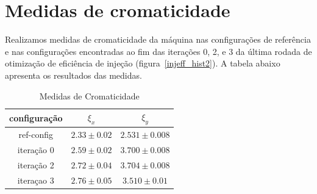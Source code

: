 \documentclass[a4paper,
               keeplastbox,   %
               ]{jacow}
\begin{document}
\section{Medidas de cromaticidade}
Realizamos medidas de cromaticidade da máquina nas configurações de referência e nas configurações encontradas ao fim das iterações 0, 2, e 3 da última rodada de otimização de eficiência de injeção (figura~\ref{injeff_hist2}). A tabela abaixo apresenta os resultados das medidas.
\begin{table}[h]
\centering
\begin{tabular}{@{}ccc@{}}
\toprule
configuração & $\xi_x$       & $\xi_y$         \\ \midrule
ref-config   & $2.33\pm0.02$ & $2.531\pm0.008$ \\
iteração 0   & $2.59\pm0.02$ & $3.700\pm0.008$   \\
iteração 2   & $2.72\pm0.04$ & $3.704\pm0.008$ \\
iteraçao 3   & $2.76\pm0.05$  & $3.510\pm0.01$   \\ \bottomrule
\end{tabular}
\caption{Medidas de Cromaticidade}
\end{table}





\end{document}
